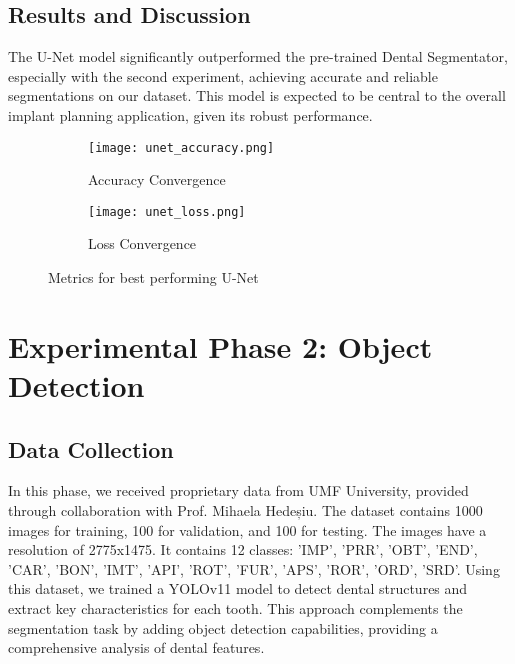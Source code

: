 \documentclass[12pt]{article}
\begin{document}
\subsection{Results and Discussion}
The U-Net model significantly outperformed the pre-trained Dental Segmentator, especially with the second experiment, achieving accurate and reliable segmentations on our dataset. This model is expected to be central to the overall implant planning application, given its robust performance.

\begin{figure}[htbp]
    \centering
    \begin{subfigure}[b]{0.45\textwidth}
        \centering
        \texttt{[image: unet\_accuracy.png]}
        \caption{Accuracy Convergence}
        \label{fig:image1}
    \end{subfigure}
    \hfill
    \begin{subfigure}[b]{0.45\textwidth}
        \centering
        \texttt{[image: unet\_loss.png]}
        \caption{Loss Convergence}
        \label{fig:image2}
    \end{subfigure}
    \caption{Metrics for best performing U-Net}
    \label{fig:side_by_side}
\end{figure}

\section{Experimental Phase 2: Object Detection}

\subsection{Data Collection}
In this phase, we received proprietary data from UMF University, provided through collaboration with Prof. Mihaela Hedeșiu. The dataset contains 1000 images for training, 100 for validation, and 100 for testing. The images have a resolution of 2775x1475. It contains 12 classes: 'IMP', 'PRR', 'OBT', 'END', 'CAR', 'BON', 'IMT', 'API', 'ROT', 'FUR', 'APS', 'ROR', 'ORD', 'SRD'.  Using this dataset, we trained a YOLOv11 model to detect dental structures and extract key characteristics for each tooth. This approach complements the segmentation task by adding object detection capabilities, providing a comprehensive analysis of dental features.
\end{document}

